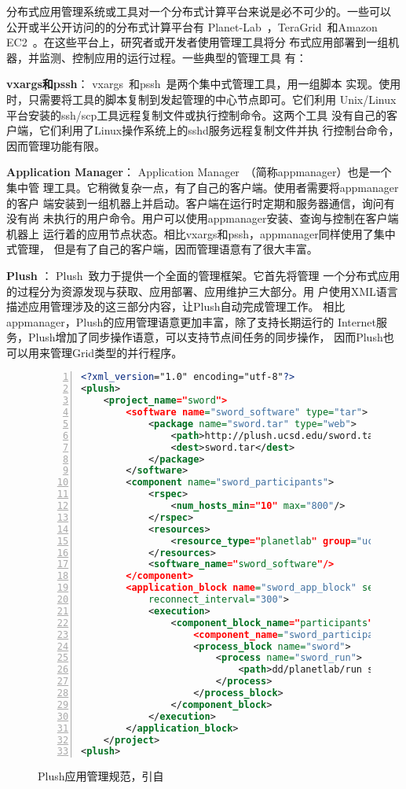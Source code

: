 分布式应用管理系统或工具对一个分布式计算平台来说是必不可少的。一些可以
公开或半公开访问的的分布式计算平台有
Planet-Lab~\cite{Bavier2004}，TeraGrid~\cite{Catlett2002}和Amazon
EC2~\cite{Garfinkel2007}。在这些平台上，研究者或开发者使用管理工具将分
布式应用部署到一组机器，并监测、控制应用的运行过程。一些典型的管理工具
有：


\textbf{vxargs和pssh}：
vxargs~\cite{vxargs}和pssh~\cite{pssh}是两个集中式管理工具，用一组脚本
实现。使用时，只需要将工具的脚本复制到发起管理的中心节点即可。它们利用
Unix/Linux平台安装的ssh/scp工具远程复制文件或执行控制命令。这两个工具
没有自己的客户端，它们利用了Linux操作系统上的sshd服务远程复制文件并执
行控制台命令，因而管理功能有限。

\textbf{Application Manager}：
Application Manager~\cite{appmanager}（简称appmanager）也是一个集中管
理工具。它稍微复杂一点，有了自己的客户端。使用者需要将appmanager的客户
端安装到一组机器上并启动。客户端在运行时定期和服务器通信，询问有没有尚
未执行的用户命令。用户可以使用appmanager安装、查询与控制在客户端机器上
运行着的应用节点状态。相比vxargs和pssh，appmanager同样使用了集中式管理，
但是有了自己的客户端，因而管理语意有了很大丰富。

\textbf{Plush} ：
Plush~\cite{plush}致力于提供一个全面的管理框架。它首先将管理
一个分布式应用的过程分为资源发现与获取、应用部署、应用维护三大部分。用
户使用XML语言描述应用管理涉及的这三部分内容，让Plush自动完成管理工作。
相比appmanager，Plush的应用管理语意更加丰富，除了支持长期运行的
Internet服务，Plush增加了同步操作语意，可以支持节点间任务的同步操作，
因而Plush也可以用来管理Grid类型的并行程序。

\begin{figure}
\centering
\begin{lstlisting}[language=XML,numbers=left]
<?xml_version="1.0" encoding="utf-8"?>
<plush>
    <project_name="sword">
        <software name="sword_software" type="tar">
            <package name="sword.tar" type="web">
                <path>http://plush.ucsd.edu/sword.tar</path>
                <dest>sword.tar</dest>
            </package>
        </software>
        <component name="sword_participants">
            <rspec>
                <num_hosts_min="10" max="800"/>
            </rspec>
            <resources>
                <resource_type="planetlab" group="ucsd_sword"/>
            </resources>
            <software_name="sword_software"/>
        </component>
        <application_block name="sword_app_block" service="1"
            reconnect_interval="300">
            <execution>
                <component_block_name="participants">
                    <component_name="sword_participants"/>
                    <process_block name="sword">
                        <process name="sword_run">
                            <path>dd/planetlab/run sword</path>
                        </process>
                    </process_block>
                </component_block>
            </execution>
        </application_block>
    </project>
<plush>
\end{lstlisting}
\caption{Plush应用管理规范，引自~\cite{plush}}
\label{fig:plush_spec}
\end{figure}


